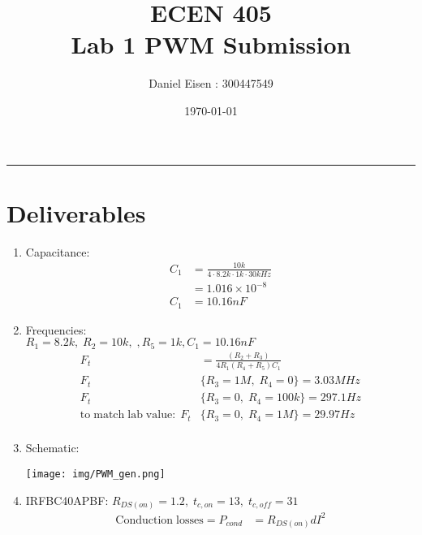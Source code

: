 \documentclass[11pt]{article}
\title{ECEN 405 \\ Lab 1 PWM Submission}
\author{Daniel Eisen : 300447549}
\date{\today}
\begin{document}
\begin{preview}

      \maketitle
      \hrule
      \section*{Deliverables}
      \begin{enumerate}
            \item Capacitance:
                  \begin{align*}
                        C_{1} &= \frac{10k}{4{\cdot}8.2k{\cdot}1k{\cdot}30kHz} \\
                              &= 1.016{\times}10^{-8} \\
                        C_{1} &= 10.16nF      
                  \end{align*}
            \item Frequencies: \\
            $R_{1}=8.2k, \; R_{2}=10k, \; , R_{5}=1k, C_{1}=10.16nF$
            \begin{align*}
                        F_{t} &= \frac{(R_{2}+R_{3})}{4R_{1}(R_{4}+R_{5})C_{1}}\\       
                        F_{t}&\{R_{3}=1M ,\; R_{4}=0\} = 3.03MHz \\
                        F_{t}&\{R_{3}=0 ,\; R_{4}=100k\} = 297.1Hz \\
                        \mathrm{to \; match \; lab \; value: \;} F_{t}&\{R_{3}=0 ,\; R_{4}=1M\} = 29.97Hz \\
                  \end{align*}
            \item Schematic:
                  \begin{center}
                        \texttt{[image: img/PWM\_gen.png]}
                  \end{center}
            \item IRFBC40APBF: $R_{DS(on)}=1.2, \; t_{c,on}=13, \; t_{c,off}=31$
                  \begin{align*}
                        \mathrm{Conduction \; losses} = P_{cond} &= R_{DS(on)}dI^{2}\\

\end{align*}
\end{enumerate}
\end{preview}
\end{document}
